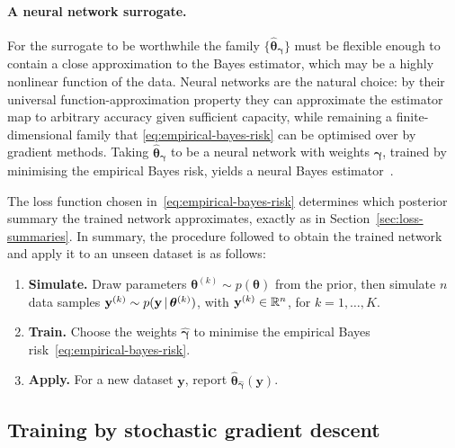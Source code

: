 \paragraph{A neural network surrogate.}
For the surrogate to be
worthwhile the family $\{\hat{\bm{\theta}}_{\bm{\gamma}}\}$ must be flexible enough to contain a close
approximation to the Bayes estimator, which may be a highly nonlinear
function of the data. Neural networks are the natural choice: by their
universal function-approximation property they can approximate the
estimator map to arbitrary accuracy given sufficient capacity, while
remaining a finite-dimensional family that
\eqref{eq:empirical-bayes-risk} can be optimised over by gradient
methods. Taking $\hat{\bm{\theta}}_{\bm{\gamma}}$ to be a neural
network with weights $\bm{\gamma}$, trained by minimising the empirical
Bayes risk, yields a neural Bayes
estimator~\citep{sainsburydale2024nbe}.

The loss function chosen in~\eqref{eq:empirical-bayes-risk} determines
which posterior summary the trained network approximates, exactly as in
Section~\ref{sec:loss-summaries}. In summary, the procedure followed to obtain the trained network and apply it to an unseen dataset is as follows:

\begin{enumerate}
  \item \textbf{Simulate.} Draw parameters
  $\bm{\theta}^{(k)} \sim p(\bm{\theta})$ from the prior, then
  simulate $n$ data samples
  $\mathbf{y}^{(k)} \sim p(\mathbf{y} \,|\, \bm{\theta}^{(k)})$,
  with $\mathbf{y}^{(k)} \in \mathbb{R}^{n}$, for $k = 1, \dots, K$.
  \item \textbf{Train.} Choose the weights $\hat{\bm{\gamma}}$ to
  minimise the empirical Bayes risk~\eqref{eq:empirical-bayes-risk}.
  \item \textbf{Apply.} For a new dataset $\mathbf{y}$, report
  $\hat{\bm{\theta}}_{\hat{\bm{\gamma}}}(\mathbf{y})$.
\end{enumerate}

\subsection{Training by stochastic gradient descent}
\label{sec:training-as-mc}

